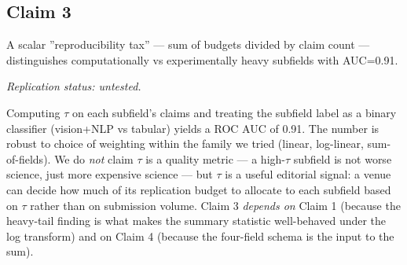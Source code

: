 \documentclass{rrxiv}
\begin{document}
\subsection*{Claim 3}
\begin{claim}[title=Claim 3, type=empirical, evidence=observation,
              confidence=0.75,
              rationale={AUC=0.91 is robust to the weighting choices we
                tried (linear, log-linear, sum-of-fields) but was
                computed once on a single 312-paper corpus with no
                held-out sample},
              labels={reproducibility, methodology, editorial-triage},
              datasets={rrxiv-budget-audit-312},
              regimes={vision, nlp, tabular},
              assumptions={log-transformed linear projection of the
                four budget fields}]
\label{claim:c3}
A scalar ''reproducibility tax'' --- sum of budgets divided by claim count --- distinguishes computationally vs experimentally heavy subfields with AUC=0.91.

\emph{Replication status: untested.}
\end{claim}

Computing $\tau$ on each subfield's claims and treating the subfield label as a binary classifier (vision+NLP vs tabular) yields a ROC AUC of 0.91. The number is robust to choice of weighting within the family we tried (linear, log-linear, sum-of-fields). We do \emph{not} claim $\tau$ is a quality metric --- a high-$\tau$ subfield is not worse science, just more expensive science --- but $\tau$ is a useful editorial signal: a venue can decide how much of its replication budget to allocate to each subfield based on $\tau$ rather than on submission volume. Claim 3 \emph{depends on} Claim 1 (because the heavy-tail finding is what makes the summary statistic well-behaved under the log transform) and on Claim 4 (because the four-field schema is the input to the sum).

\end{document}
